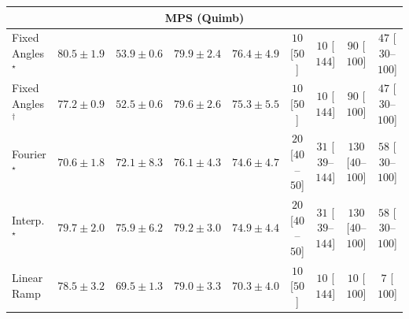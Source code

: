 \begin{tabular}{l|cccc|cccc|}
\cline{1-9}
\multicolumn{9}{c}{\rule{0pt}{8pt}MPS (Quimb)} \\
\midrule
Fixed Angles$^\star$ & {\cellcolor[HTML]{BC4503}} \color[HTML]{F1F1F1} $80.5\pm 1.9$ & {\cellcolor[HTML]{FFFCD8}} \color[HTML]{000000} $53.9\pm 0.6$ & {\cellcolor[HTML]{C34802}} \color[HTML]{F1F1F1} $79.9\pm 2.4$ & {\cellcolor[HTML]{E0630D}} \color[HTML]{F1F1F1} $76.4\pm 4.9$ & {\cellcolor[HTML]{FFF7F3}} \color[HTML]{000000} $10$ [$50$] & {\cellcolor[HTML]{FFF7F3}} \color[HTML]{000000} $10$ [$144$] & {\cellcolor[HTML]{FDE5E2}} \color[HTML]{000000} $90$ [$100$] & {\cellcolor[HTML]{FEEEEB}} \color[HTML]{000000} $47$ [$30$--$100$] \\
Fixed Angles$^\dagger$ & {\cellcolor[HTML]{DA5C0A}} \color[HTML]{F1F1F1} $77.2\pm 0.9$ & {\cellcolor[HTML]{FFFFE5}} \color[HTML]{000000} $52.5\pm 0.6$ & {\cellcolor[HTML]{C84A02}} \color[HTML]{F1F1F1} $79.6\pm 2.6$ & {\cellcolor[HTML]{E86C12}} \color[HTML]{F1F1F1} $75.3\pm 5.5$ & {\cellcolor[HTML]{FFF7F3}} \color[HTML]{000000} $10$ [$50$] & {\cellcolor[HTML]{FFF7F3}} \color[HTML]{000000} $10$ [$144$] & {\cellcolor[HTML]{FDE5E2}} \color[HTML]{000000} $90$ [$100$] & {\cellcolor[HTML]{FEEEEB}} \color[HTML]{000000} $47$ [$30$--$100$] \\
Fourier$^\star$ & {\cellcolor[HTML]{FD9627}} \color[HTML]{000000} $70.6\pm 1.8$ & {\cellcolor[HTML]{F78921}} \color[HTML]{F1F1F1} $72.1\pm 8.3$ & {\cellcolor[HTML]{E2650F}} \color[HTML]{F1F1F1} $76.1\pm 4.3$ & {\cellcolor[HTML]{ED7215}} \color[HTML]{F1F1F1} $74.6\pm 4.7$ & {\cellcolor[HTML]{FFF4F0}} \color[HTML]{000000} $20$ [$40$--$50$] & {\cellcolor[HTML]{FFF2EE}} \color[HTML]{000000} $31$ [$39$--$144$] & {\cellcolor[HTML]{FDDBD7}} \color[HTML]{000000} $130$ [$40$--$100$] & {\cellcolor[HTML]{FEECE9}} \color[HTML]{000000} $58$ [$30$--$100$] \\
Interp.$^\star$ & {\cellcolor[HTML]{C64902}} \color[HTML]{F1F1F1} $79.7\pm 2.0$ & {\cellcolor[HTML]{E3660F}} \color[HTML]{F1F1F1} $75.9\pm 6.2$ & {\cellcolor[HTML]{CB4B02}} \color[HTML]{F1F1F1} $79.2\pm 3.0$ & {\cellcolor[HTML]{EA6E13}} \color[HTML]{F1F1F1} $74.9\pm 4.4$ & {\cellcolor[HTML]{FFF4F0}} \color[HTML]{000000} $20$ [$40$--$50$] & {\cellcolor[HTML]{FFF2EE}} \color[HTML]{000000} $31$ [$39$--$144$] & {\cellcolor[HTML]{FDDBD7}} \color[HTML]{000000} $130$ [$40$--$100$] & {\cellcolor[HTML]{FEECE9}} \color[HTML]{000000} $58$ [$30$--$100$] \\
Linear Ramp & {\cellcolor[HTML]{D15205}} \color[HTML]{F1F1F1} $78.5\pm 3.2$ & {\cellcolor[HTML]{FEA030}} \color[HTML]{000000} $69.5\pm 1.3$ & {\cellcolor[HTML]{CD4D03}} \color[HTML]{F1F1F1} $79.0\pm 3.3$ & {\cellcolor[HTML]{FE9829}} \color[HTML]{000000} $70.3\pm 4.0$ & {\cellcolor[HTML]{FFF7F3}} \color[HTML]{000000} $10$ [$50$] & {\cellcolor[HTML]{FFF7F3}} \color[HTML]{000000} $10$ [$144$] & {\cellcolor[HTML]{FFF7F3}} \color[HTML]{000000} $10$ [$100$] & {\cellcolor[HTML]{FFF7F3}} \color[HTML]{000000} $7$ [$100$] \\

\end{tabular}
